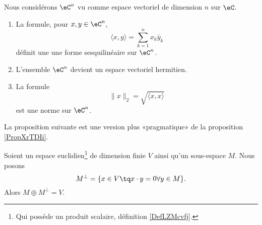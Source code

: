 \begin{proposition}      \label{PROPooMWUCooMbJuaJ}
    Nous considérons \(\eC^n\) vu comme espace vectoriel de dimension \( n\) sur \( \eC\).

    \begin{enumerate}
        \item
            La formule, pour \( x,y\in \eC^n\),
    \begin{equation}    \label{EqFormSesqQrjyPH}
        \langle x, y\rangle =\sum_{k=1}^nx_k\bar y_k
    \end{equation}
    définit une une forme sesquilinéaire sur \( \eC^n\).
\item
    L'ensemble \( \eC^n\) devient un espace vectoriel hermitien.
\item
    La formule
    \begin{equation}        \label{EQooZIXRooMGcsXY}
        \| x \|_2=  \sqrt{ \langle x, x\rangle }
    \end{equation}
    est une norme sur \( \eC^n\).
    \end{enumerate}
\end{proposition}



La proposition suivante est une version plus «pragmatique» de la proposition \ref{PropXrTDIi}.
\begin{proposition}       \label{PROPooNITTooCYcrrT}
    Soient un espace euclidien\footnote{Qui possède un produit scalaire, définition \ref{DefLZMcvfj}.} de dimension finie \( V\) ainsi qu'un sous-espace \( M\). Nous posons
    \begin{equation}
        M^{\perp}=\{ x\in V\tq x\cdot y=0\forall y\in M \}.
    \end{equation}
    Alors \( M\oplus M^{\perp}=V\).
\end{proposition}

